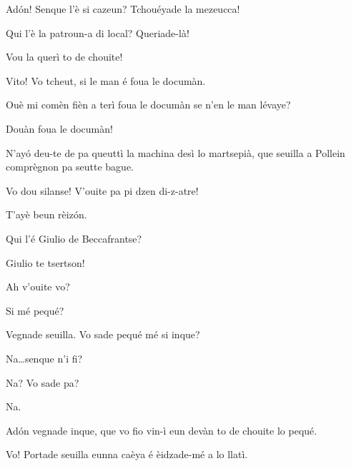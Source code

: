 \begin{drama}

\Valletspeaks Ad\'on! Senque l’è si cazeun? Tchouéyade la mezeucca!


\Valletspeaks{} Qui l’è la patroun-a di local? Queriade-là!

\Helenespeaks Vou la querì to de chouite!

\Valletspeaks Vito!  Vo tcheut, si le man é foua le documàn.


\Michelspeaks Ouè mi comèn fièn a terì foua le documàn se n'en le man lévaye?

\Valletspeaks Douàn foua le documàn!

\Pierrespeaks {} N'ay\'o deu-te de pa queuttì la machina desì lo martsepià, que seuilla a Pollein comprègnon pa seutte bague.

\Valletspeaks Vo dou silanse! V'ouite pa pi dzen di-z-atre!

\Louisspeaks{} T'ayè beun rèiz\'on.

\Valletspeaks Qui l’é Giulio de Beccafrantse? 


\Michelspeaks Giulio te tsertson!


\Valletspeaks Ah v'ouite vo?

\Giuliospeaks{} Si mé pequé? 

\Valletspeaks Vegnade seuilla. Vo sade pequé mé si inque?

\Giuliospeaks Na\ldots senque n'i fi?

\Valletspeaks Na? Vo sade pa?

\Giuliospeaks Na.

\Valletspeaks Ad\'on vegnade inque, que vo fio vin-ì eun devàn to de chouite lo pequé.


\Valletspeaks{} Vo! Portade seuilla eunna caèya é èidzade-mé a lo llatì.



\end{drama}
